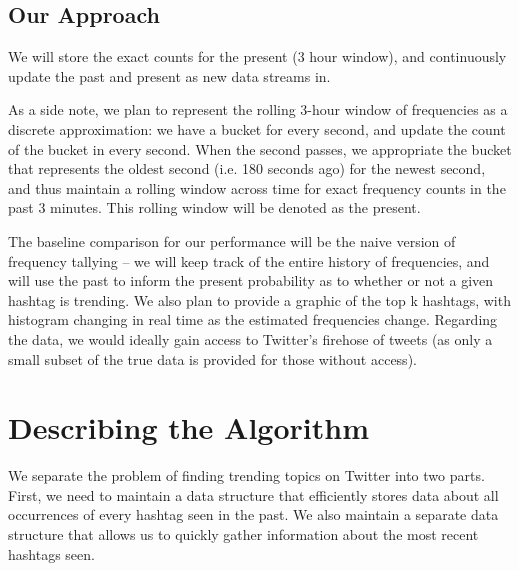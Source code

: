 \documentclass[twoside]{article}
\begin{document}
\subsection{Our Approach}


We will store the exact counts for the present (3 hour window), and continuously update the past and present as new data streams in. 


As a side note, we plan to represent the rolling 3-hour window of frequencies as a discrete approximation: we have a bucket for every second, and update the count of the bucket in every second. When the second passes, we appropriate the bucket that represents the oldest second (i.e. 180 seconds ago) for the newest second, and thus maintain a rolling window across time for exact frequency counts in the past 3 minutes. This rolling window will be denoted as the present.


The baseline comparison for our performance will be the naive version of frequency tallying -- we will keep track of the entire history of frequencies, and will use the past to inform the present probability as to whether or not a given hashtag is trending. We also plan to provide a graphic of the top k hashtags, with histogram changing in real time as the estimated frequencies change. Regarding the data, we would ideally gain access to Twitter's firehose of tweets (as only a small subset of the true data is provided for those without access). 

\section{Describing the Algorithm}


We separate the problem of finding trending topics on Twitter into two parts.  First, we need to maintain a data structure that efficiently stores data about all occurrences of every hashtag seen in the past.  We also maintain a separate data structure that allows us to quickly gather information about the most recent hashtags seen.
\end{document}
